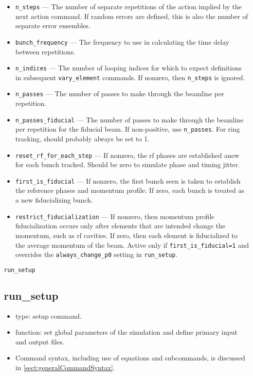 \documentclass[11pt]{article}
\begin{document}
\begin{itemize}
\item \verb|n_steps| --- The number of separate repetitions of the action implied by the next action command.
If random errors are defined, this is also the number of separate error ensembles.
\item \verb|bunch_frequency| --- The frequency to use in calculating the time delay between repetitions.
\item \verb|n_indices| --- The number of looping indices for which to expect definitions in subsequent \verb|vary_element| commands.  If nonzero, then \verb|n_steps| is ignored.
\item \verb|n_passes| --- The number of passes to make through the beamline per repetition.
\item \verb|n_passes_fiducial| --- The number of passes to make through the beamline per repetition for the fiducial beam. If non-positive, use \verb|n_passes|.
  For ring tracking, should probably always be set to 1.
\item \verb|reset_rf_for_each_step| --- If nonzero, the rf phases are 
established anew for each bunch tracked.  Should be zero to simulate
phase and timing jitter. 
\item \verb|first_is_fiducial| --- If nonzero, the first bunch seen is taken
to establish the reference phases and momentum profile.  If zero, each bunch
is treated as a new fiducializing bunch.
\item \verb|restrict_fiducialization| --- If nonzero, then  momentum profile
fiducialization occurs only after elements that are intended
change the momentum, such as rf cavities.  If zero, then each element is
fiducialized to the average momentum of the beam.
Active only if \verb|first_is_fiducial=1| and overrides the \verb|always_change_p0| setting 
in \verb|run_setup|.
\end{itemize}

\newpage
\begin{center}{\Large\verb|run_setup|}\end{center}
\subsection{run\_setup \label{subsec:runsetup}}

\begin{itemize}
\item type: setup command.
\item function: set global parameters of the simulation and define primary input and output files.
\item Command syntax, including use of equations and subcommands, is discussed in \ref{sect:generalCommandSyntax}.
\end{itemize}
\end{document}
